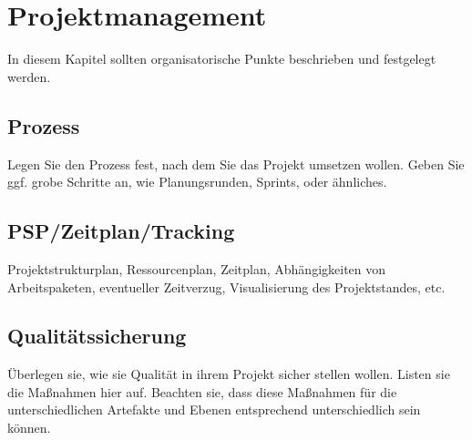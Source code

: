 \chapter{Projektmanagement}

In diesem Kapitel sollten organisatorische Punkte beschrieben und
festgelegt werden.

\section{Prozess}

Legen Sie den Prozess fest, nach dem Sie das Projekt umsetzen wollen.
Geben Sie ggf. grobe Schritte an, wie Planungsrunden, Sprints, oder
ähnliches.

\section{PSP/Zeitplan/Tracking}

Projektstrukturplan, Ressourcenplan, Zeitplan, Abhängigkeiten von
Arbeitspaketen, eventueller Zeitverzug, Visualisierung des
Projektstandes, etc.

\section{Qualitätssicherung}

Überlegen sie, wie sie Qualität in ihrem Projekt sicher stellen wollen.
Listen sie die Maßnahmen hier auf. Beachten sie, dass diese Maßnahmen
für die unterschiedlichen Artefakte und Ebenen entsprechend
unterschiedlich sein können.
